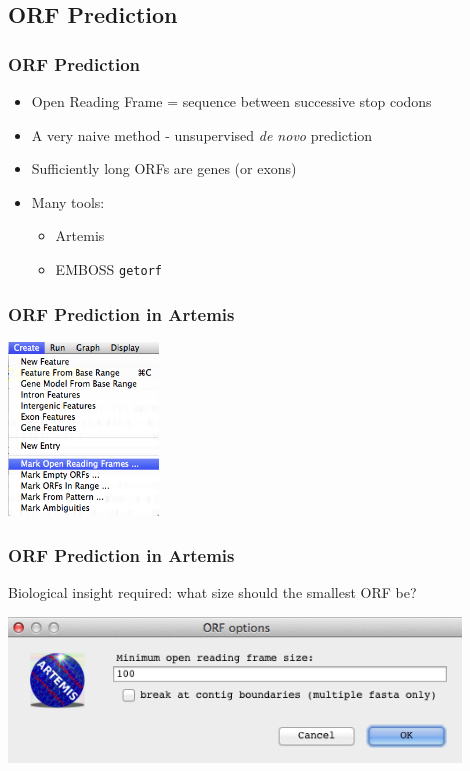 \documentclass[table]{beamer}
\begin{document}
    \subsection{ORF Prediction}
    \begin{frame}
     \frametitle{ORF Prediction}
     \begin{itemize}
       \item Open Reading Frame = sequence between successive stop codons
       \item A very naive method - unsupervised \textit{de novo} prediction
       \item Sufficiently long ORFs are genes (or exons)
       \item Many tools:
       \begin{itemize}
         \item Artemis
         \item EMBOSS \texttt{getorf}
       \end{itemize}
     \end{itemize}
    \end{frame}  

    \begin{frame}
      \frametitle{ORF Prediction in Artemis}    
      \begin{center}
        \includegraphics[width=0.3\textwidth]{images/artemis_orf0}     
      \end{center}
    \end{frame} 

    \begin{frame}
      \frametitle{ORF Prediction in Artemis}
      Biological insight required: what size should the smallest ORF be?
      \begin{center}
        \includegraphics[width=0.9\textwidth]{images/artemis_orf1}     
      \end{center}
    \end{frame} 
\end{document}
